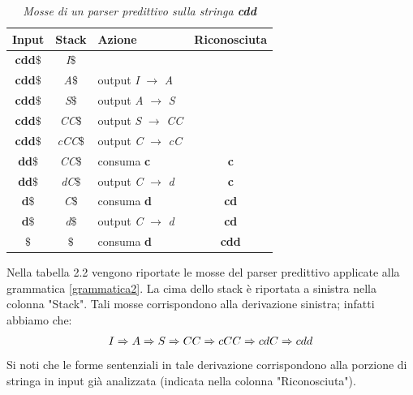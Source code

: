 {{\vspace{0.5cm}
\begin{table}
	\centering
	\label{tabellaStack}
	\begin{tabular}{cclc}
		\toprule
		\textbf{Input} & \textbf{Stack} & \textbf{Azione} & \textbf{Riconosciuta}\\
		\midrule
		\textbf{cdd$\$$} & \textit{I$\$$}  \\
		\textbf{cdd$\$$} & \textit{A$\$$}  & output \textit{I} $\to$ \textit{A} \\
		\textbf{cdd$\$$} & \textit{S$\$$}  & output \textit{A} $\to$ \textit{S} \\
		\textbf{cdd$\$$} & \textit{CC$\$$}  & output \textit{S} $\to$ \textit{CC} \\
		\textbf{cdd$\$$} & \textit{cCC$\$$}  & output \textit{C} $\to$ \textit{cC} \\
		\textbf{dd$\$$} & \textit{CC$\$$}  & consuma \textbf{c} & \textbf{c}\\
		\textbf{dd$\$$} & \textit{dC$\$$}  & output \textit{C} $\to$ \textit{d} & \textbf{c}\\
		\textbf{d$\$$} & \textit{C$\$$}  & consuma \textbf{d} & \textbf{cd}\\
		\textbf{d$\$$} & \textit{d$\$$}  & output \textit{C} $\to$ \textit{d} & \textbf{cd}\\
		\textbf{$\$$} & \textit{$\$$}  & consuma \textbf{d} & \textbf{cdd}\\
		\bottomrule
	\end{tabular}
	\caption{\textit{Mosse di un parser predittivo sulla stringa \textbf{cdd}} }
\end{table}
\noindent Nella tabella 2.2 vengono riportate le mosse del parser predittivo applicate alla grammatica \ref{grammatica2}. La cima dello stack è riportata a sinistra nella colonna "Stack". Tali mosse corrispondono alla derivazione sinistra; infatti abbiamo che:
\begin{align}
I \Rightarrow A \Rightarrow S \Rightarrow CC \Rightarrow cCC \Rightarrow cdC \Rightarrow cdd \notag
\end{align}
Si noti che le forme sentenziali in tale derivazione corrispondono alla porzione di stringa in input già analizzata (indicata nella colonna "Riconosciuta").
}}
